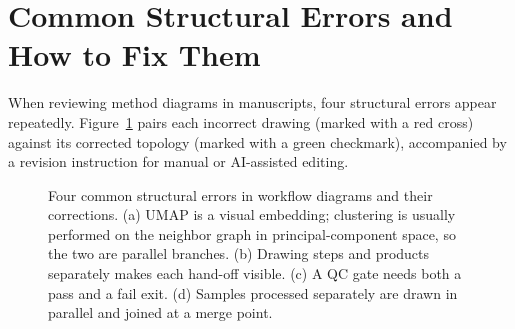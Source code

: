 \section{Common Structural Errors and How to Fix Them}

When reviewing method diagrams in manuscripts, four structural errors appear repeatedly. Figure~\ref{fig:ch06-04} pairs each incorrect drawing (marked with a red cross) against its corrected topology (marked with a green checkmark), accompanied by a revision instruction for manual or AI-assisted editing.

\begin{figure}[htbp]\centering
\resizebox{0.90\linewidth}{!}{}
\caption{Four common structural errors in workflow diagrams and their corrections. (a) UMAP is a visual embedding; clustering is usually performed on the neighbor graph in principal-component space, so the two are parallel branches. (b) Drawing steps and products separately makes each hand-off visible. (c) A QC gate needs both a pass and a fail exit. (d) Samples processed separately are drawn in parallel and joined at a merge point.}\label{fig:ch06-04}
\end{figure}

